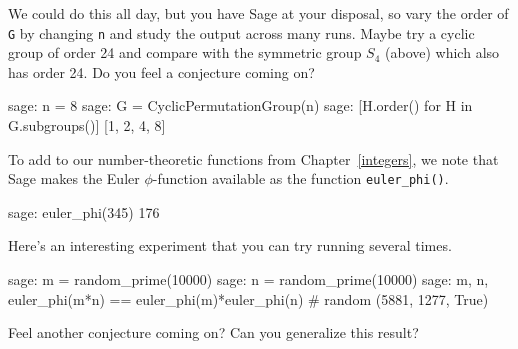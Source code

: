 %
We could do this all day, but you have Sage at your disposal, so vary the order of \verb?G? by changing \verb?n? and study the output across many runs.  Maybe try a cyclic group of order 24 and compare with the symmetric group $S_4$ (above) which also has order 24.  Do you feel a conjecture coming on?
%
\begin{sageexample}
sage: n = 8
sage: G = CyclicPermutationGroup(n)
sage: [H.order() for H in G.subgroups()]
[1, 2, 4, 8]
\end{sageexample}
%
%
To add to our number-theoretic functions from Chapter~\ref{integers}, we note that Sage makes the Euler $\phi$-function available as the function \verb?euler_phi()?.
%
\begin{sageexample}
sage: euler_phi(345)
176
\end{sageexample}
%
Here's an interesting experiment that you can try running several times.
%
\begin{sageverbatim}
sage: m = random_prime(10000)
sage: n = random_prime(10000)
sage: m, n, euler_phi(m*n) == euler_phi(m)*euler_phi(n)  # random
(5881, 1277, True)
\end{sageverbatim}
%
Feel another conjecture coming on?  Can you generalize this result?
%
\begin{sageverbatim}
\end{sageverbatim}
%
